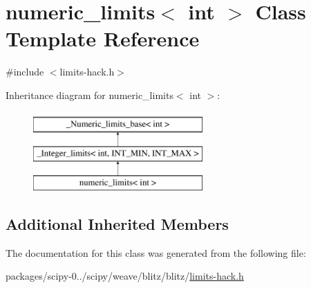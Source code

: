 \hypertarget{classnumeric__limits_3_01int_01_4}{}\section{numeric\+\_\+limits$<$ int $>$ Class Template Reference}
\label{classnumeric__limits_3_01int_01_4}


{\ttfamily \#include $<$limits-\/hack.\+h$>$}

Inheritance diagram for numeric\+\_\+limits$<$ int $>$\+:\begin{figure}[H]
\begin{center}
\leavevmode
\includegraphics[height=3.000000cm]{classnumeric__limits_3_01int_01_4}
\end{center}
\end{figure}
\subsection*{Additional Inherited Members}


The documentation for this class was generated from the following file\+:\begin{DoxyCompactItemize}
\item 
packages/scipy-\/0../scipy/weave/blitz/blitz/\hyperlink{limits-hack_8h}{limits-\/hack.\+h}\end{DoxyCompactItemize}
